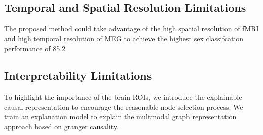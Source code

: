 \subsection{Temporal and Spatial Resolution Limitations}
The proposed method could take advantage of the high spatial 
resolution of fMRI and high temporal resolution of
MEG to achieve the highest sex classifcation performance of 85.2%
\cite{Zhao2022}

\subsection{Interpretability Limitations}
To highlight the importance of the brain ROIs, we introduce the explainable
causal representation to encourage the reasonable node selection process. We
train an explanation model to explain the multmodal graph representation approach based on granger causality.
\cite{Zhao2022}
